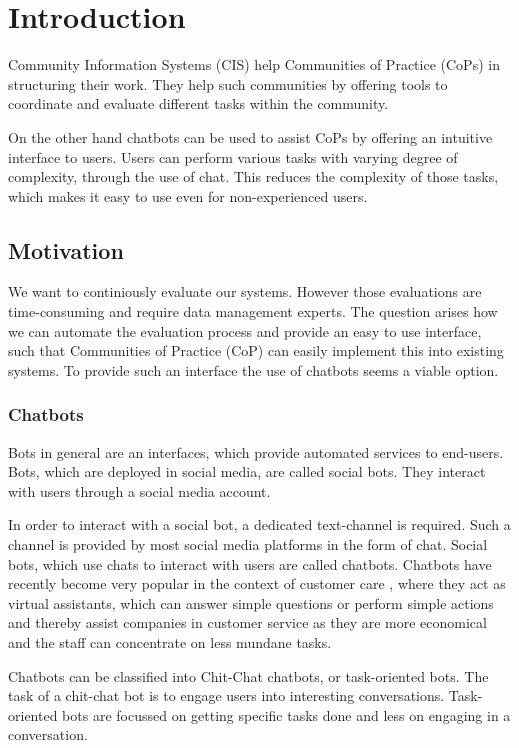 \chapter{Introduction}
Community Information Systems (CIS) help Communities of Practice (CoPs) in structuring their work. They help such communities by offering tools to coordinate and evaluate different tasks within the community.

On the other hand chatbots can be used to assist CoPs by offering an intuitive interface to users. Users can perform various tasks with varying degree of complexity, through the use of chat. This reduces the complexity of those tasks, which makes it easy to use even for non-experienced users.

\section{Motivation}
We want to continiously evaluate our systems. However those evaluations are time-consuming and require data management experts. The question arises how we can automate the evaluation process and provide an easy to use interface, such that Communities of Practice (CoP) can easily implement this into existing systems.
To provide such an interface the use of chatbots seems a viable option.

\subsection{Chatbots}
Bots in general are an interfaces, which provide automated services to end-users. Bots, which are deployed in social media, are called social bots. They interact with users through a social media account.

In order to interact with a social bot, a dedicated text-channel is required. Such a channel is provided by most social media platforms in the form of chat. Social bots, which use chats to interact with users are called chatbots. Chatbots have recently become very popular in the context of customer care \cite{CHW*17}, where they act as virtual assistants, which can answer simple questions or perform simple actions and thereby assist companies in customer service as they are more economical and the staff can concentrate on less mundane tasks.

Chatbots can be classified into Chit-Chat chatbots, or task-oriented bots. The task of a chit-chat bot is to engage users into interesting conversations. Task-oriented bots are focussed on getting specific tasks done and less on engaging in a conversation.

